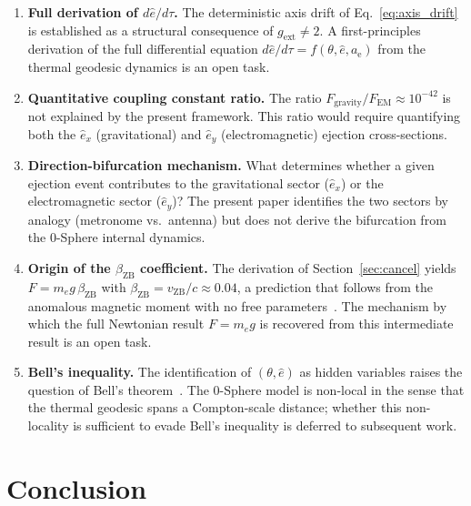 \documentclass[%
 reprint, amsmath,amssymb, aps, prb, ]{revtex4-2}
\numberwithin{equation}{section}
\newcommand{\iphase}{\theta}
\newcommand{\betaZB}{\beta_{\mathrm{ZB}}}
\newcommand{\vZB}{v_{\mathrm{ZB}}}
\newcommand{\anom}{a_{\mathrm{e}}}
\newcommand{\ehat}[1]{\hat{e}_{#1}}
\begin{document}
\begin{enumerate}[label=(\roman*)]
\item \textbf{Full derivation of $d\hat{e}/d\tau$.} The deterministic axis drift of Eq.~\eqref{eq:axis_drift} is established as a structural consequence of $g_\mathrm{ext} \neq 2$. A first-principles derivation of the full differential equation $d\hat{e}/d\tau = f(\iphase, \hat{e}, \anom)$ from the thermal geodesic dynamics is an open task.
\item \textbf{Quantitative coupling constant ratio.} The ratio $F_\mathrm{gravity}/F_\mathrm{EM} \approx 10^{-42}$ is not explained by the present framework. This ratio would require quantifying both the $\ehat{x}$ (gravitational) and $\ehat{y}$ (electromagnetic) ejection cross-sections.
\item \textbf{Direction-bifurcation mechanism.} What determines whether a given ejection event contributes to the gravitational sector ($\ehat{x}$) or the electromagnetic sector ($\ehat{y}$)? The present paper identifies the two sectors by analogy (metronome vs.\ antenna) but does not derive the bifurcation from the 0-Sphere internal dynamics.
\item \textbf{Origin of the $\betaZB$ coefficient.} The derivation of Section~\ref{sec:cancel} yields $F = m_e g\,\betaZB$ with $\betaZB = \vZB/c \approx 0.04$, a prediction that follows from the anomalous magnetic moment with no free parameters~\cite{hanamura10}. The mechanism by which the full Newtonian result $F = m_e g$ is recovered from this intermediate result is an open task.
\item \textbf{Bell's inequality.} The identification of $(\iphase, \hat{e})$ as hidden variables raises the question of Bell's theorem~\cite{bell1964}. The 0-Sphere model is non-local in the sense that the thermal geodesic spans a Compton-scale distance; whether this non-locality is sufficient to evade Bell's inequality is deferred to subsequent work.
\end{enumerate}

\section{Conclusion}
\label{sec:conclusion}
\end{document}
